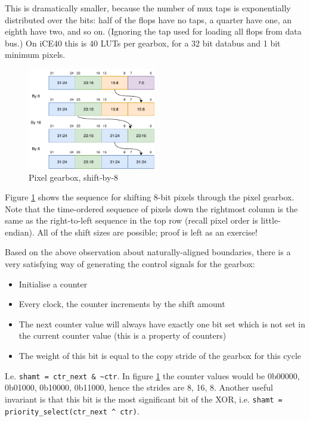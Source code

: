 This is dramatically smaller, because the number of mux taps is exponentially distributed over the bits: half of the flops have no taps, a quarter have one, an eighth have two, and so on. (Ignoring the tap used for loading all flops from data bus.) On iCE40 this is 40 LUTs per gearbox, for a 32 bit databus and 1 bit minimum pixels.

\begin{figure}[H]
\centering
\caption{Pixel gearbox, shift-by-8}
\label{diagram:pixel_gearbox_8}
\includegraphics[width=0.5\textwidth]{diagrams/pixel_gearbox_8.pdf}
\end{figure}

Figure \ref{diagram:pixel_gearbox_8} shows the sequence for shifting 8-bit pixels through the pixel gearbox. Note that the time-ordered sequence of pixels down the rightmost column is the same as the right-to-left sequence in the top row (recall pixel order is little-endian). All of the shift sizes are possible; proof is left as an exercise!

Based on the above observation about naturally-aligned boundaries, there is a very satisfying way of generating the control signals for the gearbox:

\begin{itemize}
	\item Initialise a counter
	\item Every clock, the counter increments by the shift amount
	\item The next counter value will always have exactly one bit set which is not set in the current counter value (this is a property of counters)
	\item The weight of this bit is equal to the copy stride of the gearbox for this cycle
\end{itemize}

I.e. \verb|shamt = ctr_next & ~ctr|. In figure \ref{diagram:pixel_gearbox_8} the counter values would be 0b00000, 0b01000, 0b10000, 0b11000, hence the strides are 8, 16, 8. Another useful invariant is that this bit is the most significant bit of the XOR, i.e. \verb|shamt = priority_select(ctr_next ^ ctr)|.

